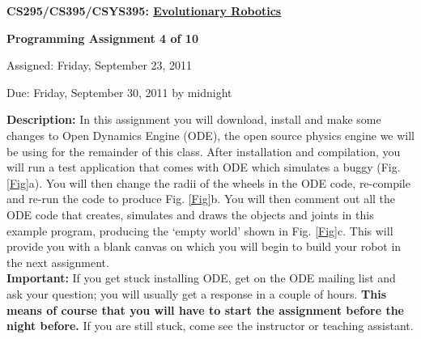 \documentclass[12pt]{article}
\begin{document}
\centerline{\bf \Large CS295/CS395/CSYS395: \href{CS295_395_Syllabus.pdf}{\underline{Evolutionary Robotics}}}

\vspace{0.5cm}

\centerline{\bf \large Programming Assignment 4 of 10}

\vspace{0.5cm}

\centerline{\large Assigned: Friday, September 23, 2011}

\vspace{0.5cm}

\centerline{\large Due: Friday, September 30, 2011 by midnight}

\vspace{0.5cm}

\noindent \textbf{Description:} In this assignment you will download, install and make some changes to Open Dynamics Engine (ODE), the open source physics engine we will be using for the remainder of this class. After installation and compilation, you will run a test application that comes with ODE which simulates a buggy (Fig. \ref{Fig}a). You will then change the radii of the wheels in the ODE code, re-compile and re-run the code to produce Fig. \ref{Fig}b. You will then comment out all the ODE code that creates, simulates and draws the objects and joints in this example program, producing the `empty world' shown in Fig. \ref{Fig}c. This will provide you with a blank canvas on which you will begin to build your robot in the next assignment. \\

\noindent \textbf{Important:} If you get stuck installing ODE, get on the ODE mailing list and ask your question; you will usually get a response in a couple of hours. \textbf{This means of course that you will have to start the assignment before the night before.} If you are still stuck, come see the instructor or teaching assistant.
\end{document}
